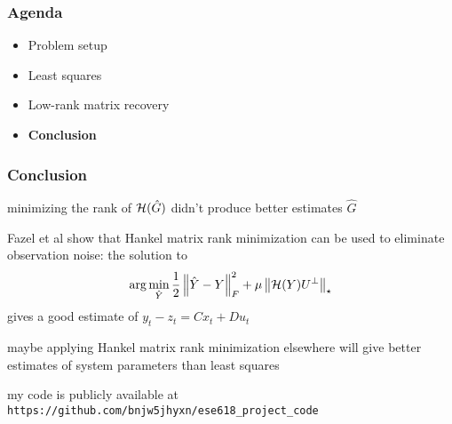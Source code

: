 \begin{frame}
\frametitle{Agenda}
\begin{itemize}
\item Problem setup
\item Least squares
\item Low-rank matrix recovery
\item \textbf{Conclusion}
\end{itemize}
\end{frame}

\begin{frame}
\frametitle{Conclusion}
minimizing the rank of $\mathcal{H}(\hat G)$
didn't produce better estimates $\hat G$

Fazel et al show that Hankel matrix rank minimization
can be used to eliminate observation noise:
the solution to
\[ \arg\min _{\hat Y} \frac{1}{2} \left\Vert{\hat Y - Y}\right\Vert_F^2 + \mu \left\Vert{\mathcal{H}(Y) U^\bot}\right\Vert_\star \]
gives a good estimate of $y_t - z_t = C x_t + D u_t$

maybe applying Hankel matrix rank minimization elsewhere
will give better estimates of system parameters than least squares

my code is publicly available at
\texttt{https://github.com/bnjw5jhyxn/ese618\_project\_code}
\end{frame}
